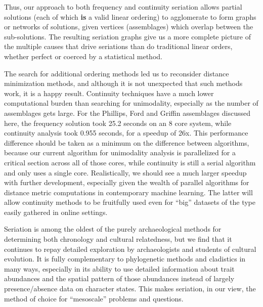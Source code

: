 \documentclass[graybox,natbib]{svmult}
\begin{document}
Thus, our approach to both frequency and continuity seriation allows
partial solutions (each of which \textbf{is} a valid linear ordering) to
agglomerate to form graphs or networks of solutions, given vertices
(assemblages) which overlap between the sub-solutions. The resulting
seriation graphs give us a more complete picture of the multiple causes
that drive seriations than do traditional linear orders, whether perfect
or coerced by a statistical method.

The search for additional ordering methods led us to reconsider distance
minimization methods, and although it is not unexpected that such
methods work, it is a happy result. Continuity techniques have a much
lower computational burden than searching for unimodality, especially as
the number of assemblages gets large. For the Phillips, Ford and Griffin
assemblages discussed here, the frequency solution took 25.2 seconds on
an 8 core system, while continuity analysis took 0.955 seconds, for a
speedup of 26x. This performance difference should be taken as a minimum
on the difference between algorithms, because our current algorithm for
unimodality analysis is parallelized for a critical section across all
of those cores, while continuity is still a serial algorithm and only
uses a single core. Realistically, we should see a much larger speedup
with further development, especially given the wealth of parallel
algorithms for distance metric computations in contemporary machine
learning. The latter will allow continuity methods to be fruitfully used
even for ``big'' datasets of the type easily gathered in online
settings.

Seriation is among the oldest of the purely archaeological methods for
determining both chronology and cultural relatedness, but we find that
it continues to repay detailed exploration by archaeologists and
students of cultural evolution. It is fully complementary to
phylogenetic methods and cladistics in many ways, especially in its
ability to use detailed information about trait abundances and the
spatial pattern of those abundances instead of largely presence/absence
data on character states. This makes seriation, in our view, the method
of choice for ``mesoscale'' problems and questions.





\end{document}
